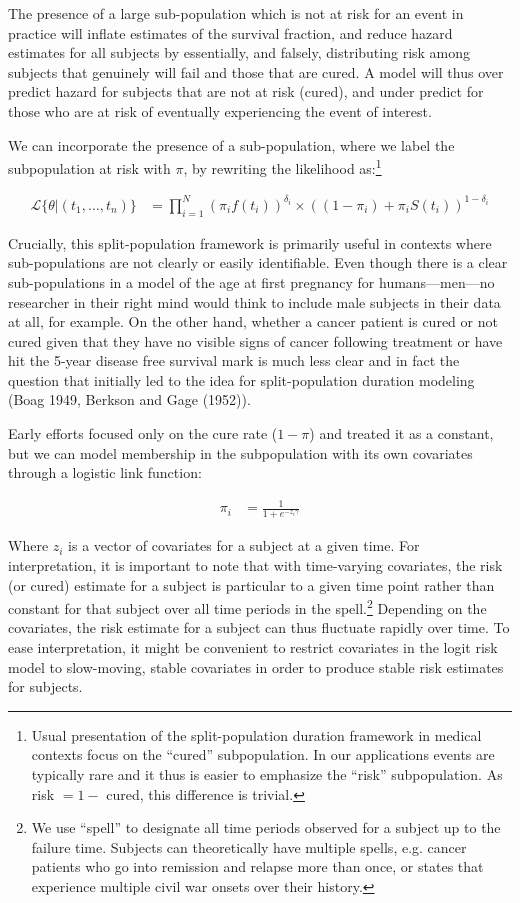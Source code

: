 \documentclass[article]{jss}
\begin{document}
The presence of a large sub-population which is not at risk for an event
in practice will inflate estimates of the survival fraction, and reduce
hazard estimates for all subjects by essentially, and falsely,
distributing risk among subjects that genuinely will fail and those that
are cured. A model will thus over predict hazard for subjects that are
not at risk (cured), and under predict for those who are at risk of
eventually experiencing the event of interest.

We can incorporate the presence of a sub-population, where we label the
subpopulation at risk with \(\pi\), by rewriting the likelihood
as:\footnote{Usual presentation of the split-population duration framework in medical contexts focus on the ``cured'' subpopulation. In our applications events are typically rare and it thus is easier to emphasize the ``risk'' subpopulation. As risk $= 1 - $ cured, this difference is trivial.}

\begin{align}
\mathcal{L}\{\theta|(t_{1}, \dots, t_{n})\} &= \prod_{i=1}^{N} \left(\pi_i f(t_i)\right)^{\delta_i} \times  \left((1-\pi_i) + \pi_i S(t_i)\right)^{1-\delta_i}
\end{align}

Crucially, this split-population framework is primarily useful in
contexts where sub-populations are not clearly or easily identifiable.
Even though there is a clear sub-populations in a model of the age at
first pregnancy for humans---men---no researcher in their right mind
would think to include male subjects in their data at all, for example.
On the other hand, whether a cancer patient is cured or not cured given
that they have no visible signs of cancer following treatment or have
hit the 5-year disease free survival mark is much less clear and in fact
the question that initially led to the idea for split-population
duration modeling (Boag 1949, Berkson and Gage (1952)).

Early efforts focused only on the cure rate (\(1 - \pi\)) and treated it
as a constant, but we can model membership in the subpopulation with its
own covariates through a logistic link function:

\begin{align}
\pi_i &= \frac{1}{1 + e^{-z_i \gamma}}
\end{align}

Where \(z_i\) is a vector of covariates for a subject at a given time.
For interpretation, it is important to note that with time-varying
covariates, the risk (or cured) estimate for a subject is particular to
a given time point rather than constant for that subject over all time
periods in the
spell.\footnote{We use ``spell'' to designate all time periods observed for a subject up to the failure time. Subjects can theoretically have multiple spells, e.g. cancer patients who go into remission and relapse more than once, or states that experience multiple civil war onsets over their history.}
Depending on the covariates, the risk estimate for a subject can thus
fluctuate rapidly over time. To ease interpretation, it might be
convenient to restrict covariates in the logit risk model to
slow-moving, stable covariates in order to produce stable risk estimates
for subjects.
\end{document}
